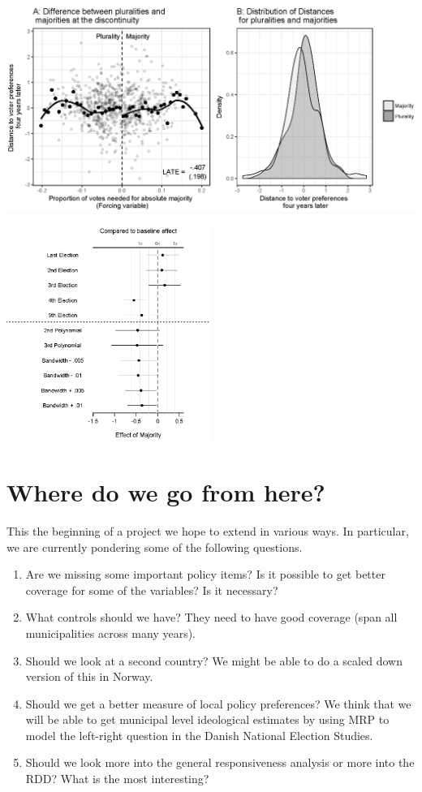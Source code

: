 \documentclass[10pt,aspectratio=169]{beamer}
\begin{document}
\begin{frame}		
\centering	
\includegraphics[width=1\textwidth]{images/rddCongruence.eps}
\end{frame}

\begin{frame}	
\centering		
\includegraphics[width=0.5\textwidth]{images/New_robustness_rd3.eps}
\end{frame}

\section[Conclusion]{Where do we go from here?}

\begin{frame}	
This the beginning of a project we hope to extend in various ways. In particular, we are currently pondering some of the following questions.

\begin{enumerate}
	\item Are we missing some important policy items? Is it possible to get better coverage for some of the variables? Is it necessary?
	\item  What controls should we have? They need to have good coverage (span all municipalities across many years).
	\item Should we look at a second country? We might be able to do a scaled down version of this in Norway. 
	\item Should we get a better measure of local policy preferences? We think that we will be able to get municipal level ideological estimates by using MRP to model the left-right question in the Danish National Election Studies.
	\item Should we look more into the general responsiveness analysis or more into the RDD? What is the most interesting?
\end{enumerate}
\end{frame}

\begin{frame}


\end{frame}
\end{document}
